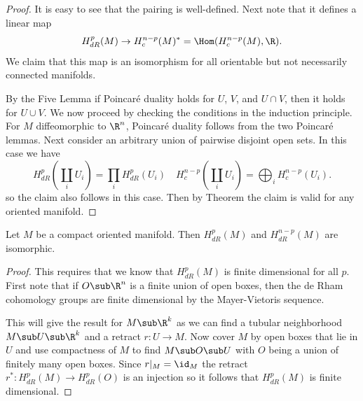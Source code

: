 \begin{proof}
It is easy to see that the pairing is well-defined. Next note that it defines a
linear map
\[H^p_{dR}(M)\to H^{n-p}_c(M)^*=\Hom(H^{n-p}_c(M),\R).\]
We claim that this map is an isomorphism for all orientable but not necessarily connected
manifolds.\par
By the Five Lemma if Poincar\'e duality holds for $U$, $V$, and $U\cap V$, then it holds for $U\cup V$. We now proceed by checking the conditions in the induction principle. 
For $M$ diffeomorphic to $\R^n$, Poincar\'e duality follows from the two Poincar\'e lemmas. Next consider an arbitrary union of pairwise disjoint open sets. In this case we have
\[H^p_{dR}(\coprod_iU_i)=\prod_iH^p_{dR}(U_i)\quad H^{n-p}_c(\coprod_iU_i)=\bigoplus_iH^{n-p}_c(U_i).\]
so the claim also follows in this case. Then by Theorem the claim is valid for any oriented manifold.
\end{proof}
\begin{corollary}
Let $M$ be a compact oriented manifold. Then $H^p_{dR}(M)$ and $H^{n-p}_{dR}(M)$ are isomorphic.
\end{corollary}
\begin{proof}
This requires that we know that $H^p_{dR}(M)$ is finite dimensional for all $p$. First note that if $O\sub\R^n$ is a finite union of open boxes, then the de Rham cohomology 
groups are finite dimensional by the Mayer-Vietoris sequence.\par
This will give the result for $M\sub\R^k$ as we can find a tubular neighborhood $M\sub U\sub\R^k$ and a retract $r:U\to M$. Now cover $M$ by open boxes that lie in $U$ 
and use compactness of $M$ to find $M\sub O\sub U$ with $O$ being a union of finitely many open boxes. Since $r|_M=\id_M$ the retract $r^*:H^p_{dR}(M)\to H^p_{dR}(O)$ is 
an injection so it follows that $H^p_{dR}(M)$ is finite dimensional.
\end{proof}
